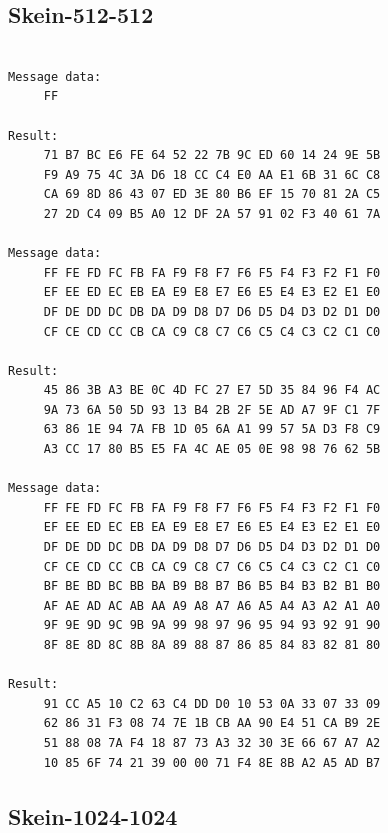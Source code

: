 \documentclass[11pt,twoside]{article}
\begin{document}
\subsection{Skein-512-512}

\begin{verbatim}

Message data:
     FF

Result:
     71 B7 BC E6 FE 64 52 22 7B 9C ED 60 14 24 9E 5B
     F9 A9 75 4C 3A D6 18 CC C4 E0 AA E1 6B 31 6C C8
     CA 69 8D 86 43 07 ED 3E 80 B6 EF 15 70 81 2A C5
     27 2D C4 09 B5 A0 12 DF 2A 57 91 02 F3 40 61 7A

Message data:
     FF FE FD FC FB FA F9 F8 F7 F6 F5 F4 F3 F2 F1 F0
     EF EE ED EC EB EA E9 E8 E7 E6 E5 E4 E3 E2 E1 E0
     DF DE DD DC DB DA D9 D8 D7 D6 D5 D4 D3 D2 D1 D0
     CF CE CD CC CB CA C9 C8 C7 C6 C5 C4 C3 C2 C1 C0

Result:
     45 86 3B A3 BE 0C 4D FC 27 E7 5D 35 84 96 F4 AC
     9A 73 6A 50 5D 93 13 B4 2B 2F 5E AD A7 9F C1 7F
     63 86 1E 94 7A FB 1D 05 6A A1 99 57 5A D3 F8 C9
     A3 CC 17 80 B5 E5 FA 4C AE 05 0E 98 98 76 62 5B

Message data:
     FF FE FD FC FB FA F9 F8 F7 F6 F5 F4 F3 F2 F1 F0
     EF EE ED EC EB EA E9 E8 E7 E6 E5 E4 E3 E2 E1 E0
     DF DE DD DC DB DA D9 D8 D7 D6 D5 D4 D3 D2 D1 D0
     CF CE CD CC CB CA C9 C8 C7 C6 C5 C4 C3 C2 C1 C0
     BF BE BD BC BB BA B9 B8 B7 B6 B5 B4 B3 B2 B1 B0
     AF AE AD AC AB AA A9 A8 A7 A6 A5 A4 A3 A2 A1 A0
     9F 9E 9D 9C 9B 9A 99 98 97 96 95 94 93 92 91 90
     8F 8E 8D 8C 8B 8A 89 88 87 86 85 84 83 82 81 80

Result:
     91 CC A5 10 C2 63 C4 DD D0 10 53 0A 33 07 33 09
     62 86 31 F3 08 74 7E 1B CB AA 90 E4 51 CA B9 2E
     51 88 08 7A F4 18 87 73 A3 32 30 3E 66 67 A7 A2
     10 85 6F 74 21 39 00 00 71 F4 8E 8B A2 A5 AD B7

\end{verbatim}

\subsection{Skein-1024-1024}
\end{document}

